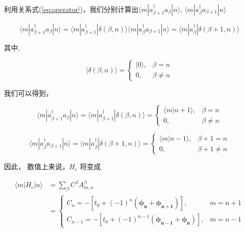 \documentclass[12pt,]{report}
\begin{document}
\noindent
利用关系式(\ref{eq:operator})，我们分别计算出\(\langle m |a_{\beta+1}^\dagger a_\beta| n \rangle\),
\(\langle m |a_{\beta}^\dagger a_{\beta+1}| n \rangle\)

\begin{equation}
\langle m |a_{\beta+1}^\dagger a_\beta| n \rangle=\langle m |a_{\beta+1}^\dagger | \delta(\beta,n) \rangle 
\langle m |a_{\beta}^\dagger a_{\beta+1}| n \rangle=\langle m |a_{\beta}^\dagger | \delta(\beta+1,n) \rangle
\end{equation}

\noindent
其中,

\begin{equation}
| \delta(\beta,n) \rangle=\begin{cases}
|0 \rangle, &  \beta=n\\
0, & \beta\neq n
\end{cases}
\end{equation}

\noindent
我们可以得到，

\begin{equation}
\langle m |a_{\beta+1}^\dagger a_\beta| n \rangle
=\langle m |a_{\beta+1}^\dagger | \delta(\beta,n) \rangle
=
\begin{cases}
    \langle m | n + 1 \rangle, & \beta = n \\
    0, & \beta \neq  n
\end{cases}
\end{equation}

\begin{equation}
\langle m |a_{\beta}^\dagger a_{\beta+1}| n \rangle
=\langle m |a_{\beta}^\dagger | \delta(\beta+1,n) \rangle
=
\begin{cases}
    \langle m | n - 1 \rangle, & \beta + 1 = n \\
    0, & \beta + 1 \neq  n
\end{cases}
\end{equation}

\noindent
因此， 数值上来说，\(H_e\) 将变成

\begin{equation} \label{eq:dig_H_e}
\begin{split}
\langle m | H_e | n \rangle
 &=\sum\limits_{\beta}C^\beta A_{m,n}^\beta \\
 &=
\begin{cases}
    C_n=-[t_0+(-1)^n(\bm{\phi_n}+\bm{\phi_{n+1}})], & m = n +1\\
    C_{n-1}=-[t_0+(-1)^{n-1}(\bm{\phi_{n-1}}+\bm{\phi_n})], & m = n - 1
\end{cases}
\end{split}
\end{equation}
\end{document}
